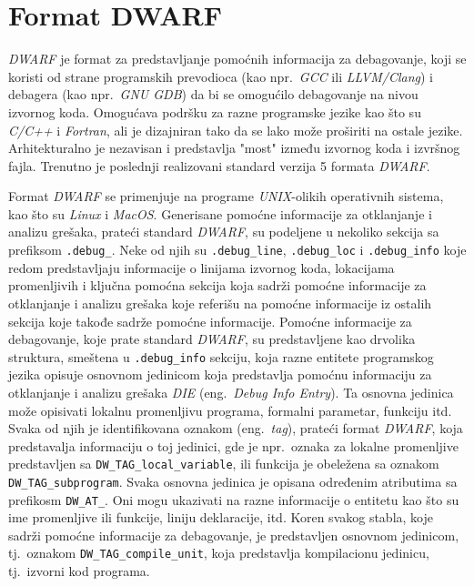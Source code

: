 \documentclass[12pt,oneside]{memoir}
\begin{document}
\section{Format DWARF}

\emph{DWARF} je format za predstavljanje pomoćnih informacija za debagovanje, koji se koristi od strane programskih prevodioca (kao npr.~\emph{GCC} ili \emph{LLVM/Clang}) i debagera (kao npr.~\emph{GNU GDB}) da bi se omogućilo debagovanje na nivou izvornog koda. Omogućava podršku za razne programske jezike kao što su \emph{C/C++} i \emph{Fortran}, ali je dizajniran tako da se lako može proširiti na ostale jezike. Arhitekturalno je nezavisan i predstavlja "most" između izvornog koda i izvršnog fajla. Trenutno je poslednji realizovani standard verzija 5 formata \emph{DWARF}.

Format \emph{DWARF} se primenjuje na programe \emph{UNIX}-olikih operativnih sistema, kao što su \emph{Linux} i \emph{MacOS}. Generisane pomoćne informacije za otklanjanje i analizu grešaka, prateći standard \emph{DWARF}, su podeljene u nekoliko sekcija sa prefiksom \texttt{.debug\_}. Neke od njih su \texttt{.debug\_line}, \texttt{.debug\_loc} i \texttt{.debug\_info} koje redom predstavljaju informacije o linijama izvornog koda, lokacijama promenljivih i ključna pomoćna sekcija koja sadrži pomoćne informacije za otklanjanje i analizu grešaka koje referišu na pomoćne informacije iz ostalih sekcija koje takođe sadrže pomoćne informacije.
Pomoćne informacije za debagovanje, koje prate standard \emph{DWARF}, su predstavljene kao drvolika struktura, smeštena u \texttt{.debug\_info} sekciju,  koja razne entitete programskog jezika opisuje osnovnom jedinicom koja predstavlja pomoćnu informaciju za otklanjanje i analizu grešaka \emph{DIE} (eng.~\emph{Debug Info Entry}). Ta osnovna jedinica može opisivati lokalnu promenljivu programa, formalni parametar, funkciju itd. Svaka od njih je identifikovana oznakom (eng.~\emph{tag}), prateći format \emph{DWARF}, koja predstavalja informaciju o toj jedinici, gde je npr.~oznaka za lokalne promenljive predstavljen sa \texttt{DW\_TAG\_local\_variable}, ili funkcija je obeležena sa oznakom \texttt{DW\_TAG\_subprogram}. Svaka osnovna jedinica je opisana određenim atributima sa prefikosm \texttt{DW\_AT\_}. Oni mogu ukazivati na razne informacije o entitetu kao što su ime promenljive ili funkcije, liniju deklaracije, itd. Koren svakog stabla, koje sadrži pomoćne informacije za debagovanje, je predstavljen osnovnom jedinicom, tj.~oznakom \texttt{DW\_TAG\_compile\_unit}, koja predstavlja kompilacionu jedinicu, tj.~izvorni kod programa.\newpage
\end{document}
